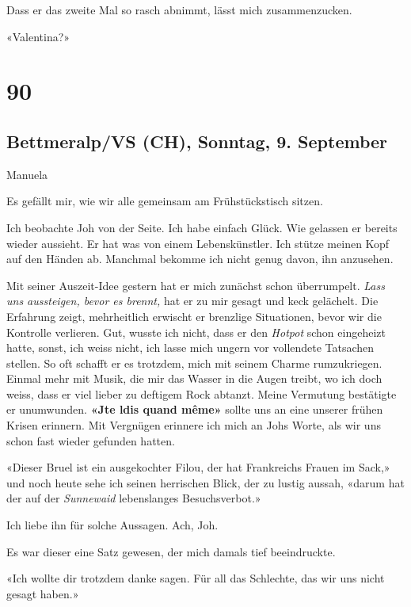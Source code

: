 Dass er das zweite Mal so rasch abnimmt, lässt mich zusammenzucken.

«Valentina?»

\chapter{90}\label{section-90}

\section{Bettmeralp/VS (CH), Sonntag, 9.
September}\label{bettmeralpvs-ch-sonntag-9.-september}

Manuela

Es gefällt mir, wie wir alle gemeinsam am Frühstückstisch sitzen.

Ich beobachte Joh von der Seite. Ich habe einfach Glück. Wie gelassen er
bereits wieder aussieht. Er hat was von einem Lebenskünstler. Ich stütze
meinen Kopf auf den Händen ab. Manchmal bekomme ich nicht genug davon,
ihn anzusehen.

Mit seiner Auszeit-Idee gestern hat er mich zunächst schon überrumpelt.
\emph{Lass uns aussteigen, bevor es brennt,} hat er zu mir gesagt und
keck gelächelt. Die Erfahrung zeigt, mehrheitlich erwischt er brenzlige
Situationen, bevor wir die Kontrolle verlieren. Gut, wusste ich nicht,
dass er den \emph{Hotpot} schon eingeheizt hatte, sonst, ich weiss
nicht, ich lasse mich ungern vor vollendete Tatsachen stellen. So oft
schafft er es trotzdem, mich mit seinem Charme rumzukriegen. Einmal mehr
mit Musik, die mir das Wasser in die Augen treibt, wo ich doch weiss,
dass er viel lieber zu deftigem Rock abtanzt. Meine Vermutung bestätigte
er unumwunden. \textbf{«J\textquotesingle te l\textquotesingle dis quand
même»} sollte uns an eine unserer frühen Krisen erinnern. Mit Vergnügen
erinnere ich mich an Johs Worte, als wir uns schon fast wieder gefunden
hatten.

«Dieser Bruel ist ein ausgekochter Filou, der hat Frankreichs Frauen im
Sack,» und noch heute sehe ich seinen herrischen Blick, der zu lustig
aussah, «darum hat der auf der \emph{Sunnewaid} lebenslanges
Besuchsverbot.»

Ich liebe ihn für solche Aussagen. Ach, Joh.

Es war dieser eine Satz gewesen, der mich damals tief beeindruckte.

«Ich wollte dir trotzdem danke sagen. Für all das Schlechte, das wir uns
nicht gesagt haben.»

